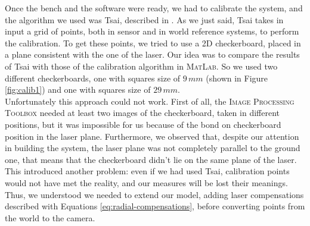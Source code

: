 Once the bench and the software were ready, we had to calibrate the system, and the algorithm we used was Tsai, described in \cite{TsaiTvLenses}. As we  just said, Tsai takes in input a grid of points, both in sensor and in world reference systems, to perform the calibration. To get these points, we tried to use a 2D checkerboard, placed in a plane consistent with the one of the laser. Our idea was to compare the results of Tsai with those of the calibration algorithm in \textsc{MatLab}. So we used two different checkerboards, one with squares size of $9 \, mm$ (shown in Figure \ref{fig:calib1}) and one with squares size of $29 \, mm$. \\
Unfortunately this approach could not work. First of all, the \textsc{Image Processing Toolbox} needed at least two images of the checkerboard, taken in different positions, but it was impossible for us because of the bond on checkerboard position in the laser plane. Furthermore, we observed that, despite our attention in building the system, the laser plane was not completely parallel to the ground one, that means that the checkerboard didn't lie on the same plane of the laser. This introduced another problem: even if we had used Tsai, calibration points would not have met the reality, and our measures will be lost their meanings. Thus, we understood we needed to extend our model, adding laser compensations described with Equations \ref{eq:radial-compensations}, before converting points from the world to the camera. \\

